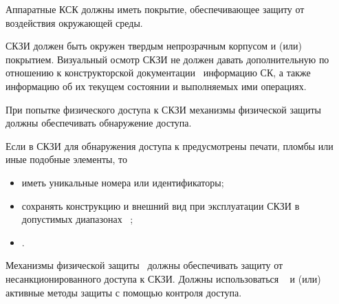 \label{R.PS.Passivation} %
Аппаратные КСК должны иметь покрытие, обеспечивающее защиту от 
 воздействия окружающей среды. 

\begin{note*}
\end{note*}


\label{R.PS.Coating} %
СКЗИ должен быть окружен твердым непрозрачным корпусом и (или) покрытием.
%
Визуальный осмотр СКЗИ не должен давать дополнительную по отношению 
к конструкторской документации~ информацию 
СК, а также информацию об их текущем состоянии и выполняемых ими  
операциях.


\label{R.PS.PassiveDetection} %
При попытке физического доступа к  СКЗИ механизмы физической защиты~ 
должны обеспечивать обнаружение доступа. 

\label{R.PS.PassiveDetectionId} %
Если в СКЗИ для обнаружения доступа к  предусмотрены печати, пломбы или иные подобные 
элементы, то 
\begin{itemize}
\item
{} 
иметь уникальные номера или идентификаторы;
\item
{}
сохранять конструкцию и внешний вид при эксплуатации СКЗИ в допустимых 
диапазонах ~;
\item
{}.
\end{itemize}


\label{R.PS.ActiveDetectionSensor} %
Механизмы физической защиты~ должны обеспечивать 
защиту от несанкционированного доступа к  СКЗИ. 
%
Должны использоваться ~ 
и (или) активные методы защиты с помощью  контроля доступа.

